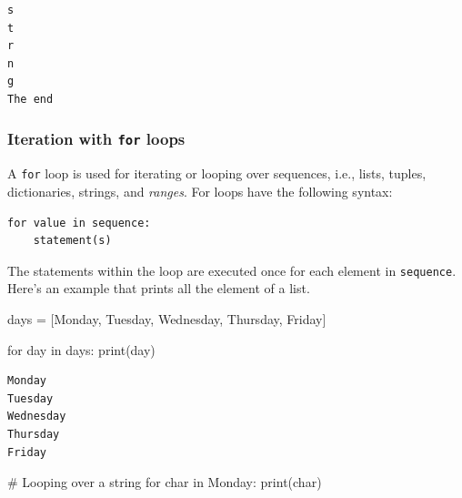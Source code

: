 \documentclass[
  letterpaper,
  DIV=11,
  numbers=noendperiod]{scrreprt}
\newenvironment{Shaded}{\begin{snugshade}}{\end{snugshade}}
\newcommand{\BuiltInTok}[1]{\textcolor[rgb]{0.00,0.23,0.31}{#1}}
\newcommand{\CommentTok}[1]{\textcolor[rgb]{0.37,0.37,0.37}{#1}}
\newcommand{\ControlFlowTok}[1]{\textcolor[rgb]{0.00,0.23,0.31}{#1}}
\newcommand{\KeywordTok}[1]{\textcolor[rgb]{0.00,0.23,0.31}{#1}}
\newcommand{\NormalTok}[1]{\textcolor[rgb]{0.00,0.23,0.31}{#1}}
\newcommand{\OperatorTok}[1]{\textcolor[rgb]{0.37,0.37,0.37}{#1}}
\newcommand{\StringTok}[1]{\textcolor[rgb]{0.13,0.47,0.30}{#1}}
\begin{document}
\begin{verbatim}
s
t
r
n
g
The end
\end{verbatim}

\hypertarget{iteration-with-for-loops}{%
\subsubsection{\texorpdfstring{Iteration with \texttt{for}
loops}{Iteration with for loops}}\label{iteration-with-for-loops}}

A \texttt{for} loop is used for iterating or looping over sequences,
i.e., lists, tuples, dictionaries, strings, and \emph{ranges}. For loops
have the following syntax:

\begin{verbatim}
for value in sequence:
    statement(s)
\end{verbatim}

The statements within the loop are executed once for each element in
\texttt{sequence}. Here's an example that prints all the element of a
list.

\begin{Shaded}
\begin{Highlighting}[]
\NormalTok{days }\OperatorTok{=}\NormalTok{ [}\StringTok{\textquotesingle{}Monday\textquotesingle{}}\NormalTok{, }\StringTok{\textquotesingle{}Tuesday\textquotesingle{}}\NormalTok{, }\StringTok{\textquotesingle{}Wednesday\textquotesingle{}}\NormalTok{, }\StringTok{\textquotesingle{}Thursday\textquotesingle{}}\NormalTok{, }\StringTok{\textquotesingle{}Friday\textquotesingle{}}\NormalTok{]}

\ControlFlowTok{for}\NormalTok{ day }\KeywordTok{in}\NormalTok{ days:}
    \BuiltInTok{print}\NormalTok{(day)}
\end{Highlighting}
\end{Shaded}

\begin{verbatim}
Monday
Tuesday
Wednesday
Thursday
Friday
\end{verbatim}

\begin{Shaded}
\begin{Highlighting}[]
\CommentTok{\# Looping over a string}
\ControlFlowTok{for}\NormalTok{ char }\KeywordTok{in} \StringTok{\textquotesingle{}Monday\textquotesingle{}}\NormalTok{:}
    \BuiltInTok{print}\NormalTok{(char)}
\end{Highlighting}
\end{Shaded}
\end{document}
